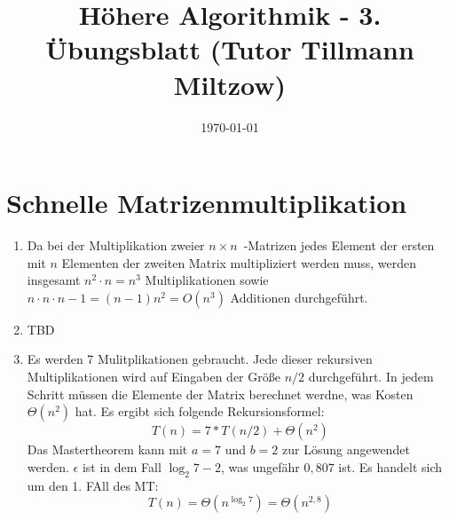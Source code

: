 \documentclass[a4paper,10pt]{scrartcl}
\title{H\"ohere Algorithmik - 3. \"Ubungsblatt (Tutor Tillmann Miltzow)}
\author{\Authors}
\date{\today}
\begin{document}
\maketitle

\section{Schnelle Matrizenmultiplikation}
\begin{enumerate}
\item	Da bei der Multiplikation zweier $n \times n$~-Matrizen jedes
	Element der ersten mit $n$ Elementen der zweiten Matrix
	multipliziert werden muss, werden insgesamt $n^2 \cdot n = n^3$
	Multiplikationen sowie $n \cdot n \cdot n-1 = (n-1)n^2 = O(n^3)$
	Additionen durchgeführt.

\item
  TBD

\item
  Es werden 7 Mulitplikationen gebraucht. Jede dieser rekursiven Multiplikationen wird auf Eingaben der Größe $n/2$ durchgeführt. In jedem Schritt müssen die Elemente der Matrix berechnet werdne, was Kosten $\Theta(n^2)$ hat. Es ergibt sich folgende Rekursionsformel:
\[T(n) = 7 * T(n/2) + \Theta(n^2)\]
Das Mastertheorem kann mit $a=7$ und $b=2$ zur Lösung angewendet werden. $\epsilon$ ist in dem Fall $\log_2 7 - 2$, was ungefähr $0,807$ ist.
Es handelt sich um den 1. FAll des MT:
\[ T(n) = \Theta (n^{\log_2 7}) = \Theta(n^{2,8})\]
\end{enumerate}
\end{document}
